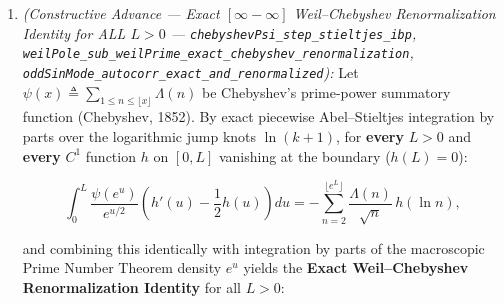 \documentclass[
  11pt,
]{article}
\begin{document}
\begin{enumerate}
  \[\int_{-L/2}^{L/2} \Big(\frac{d^k}{dx^k}\sin\!\left(\frac{2\pi x}{L}\right)\Big)^2 dx = \left(\frac{2\pi}{L}\right)^{2k} \cdot \frac{L}{2}.\]

  Consequently, for \textbf{every} finite prime-power cutoff
  \(N_{\max} \in \mathbb{N}\), \textbf{every} hyperviscosity or Jerk
  regularization order \(k \ge 1\) (\(k = 1\) Navier--Stokes viscosity,
  \(k = 2\) biharmonic hyperviscosity, \(k = 3\) third-order Jerk
  dissipation), and \textbf{every} coupling constant
  \(\varepsilon > 0\), there exists an explicit threshold
  \(L_0 = \max\!\big(100,\, M(N_{\max}) + \varepsilon + 1000\big) > 0\)
  such that for \textbf{every} \(L \ge L_0\):

  \[W_{\text{pole}}(L, g_L) + W_\infty(L, g_L) + \varepsilon \int_{-L/2}^{L/2} \big(g_L^{(k)}(x)\big)^2 dx - W_{\text{prime}, \le N_{\max}}(L, g_L) < 0.\]

  \emph{Structural UV/IR separation:} Higher-order Navier--Stokes and
  Jerk operators regularize \textbf{ultraviolet} (\(\omega \to \infty\))
  blow-up singularities because their spectral weight \(\omega^{2k}\)
  diverges at high frequency. By contrast, Route A's pole obstruction
  lives in the \textbf{infrared} (\(\omega = 2\pi/L \to 0\) as
  \(L \to \infty\)), where every derivative penalty decays polynomially
  as \(\varepsilon(2\pi/L)^{2k} \to 0\) against the exponentially
  diverging pole \(-\mathcal{O}(L^{-3} e^{L/2})\).
\item
  \emph{(Constructive Advance --- Exact \([\infty - \infty]\)
  Weil--Chebyshev Renormalization Identity for ALL \(L > 0\) ---
  \texttt{chebyshevPsi\_step\_stieltjes\_ibp},
  \texttt{weilPole\_sub\_weilPrime\_exact\_chebyshev\_renormalization},
  \texttt{oddSinMode\_autocorr\_exact\_and\_renormalized}):} Let
  \(\psi(x) \triangleq \sum_{1 \le n \le \lfloor x \rfloor} \Lambda(n)\)
  be Chebyshev's prime-power summatory function (Chebyshev, 1852). By
  exact piecewise Abel--Stieltjes integration by parts over the
  logarithmic jump knots \(\ln(k+1)\), for \textbf{every} \(L > 0\) and
  \textbf{every} \(C^1\) function \(h\) on \([0, L]\) vanishing at the
  boundary (\(h(L) = 0\)):

  \[\int_0^L \frac{\psi(e^u)}{e^{u/2}}\left(h'(u) - \frac{1}{2}h(u)\right) du = -\sum_{n=2}^{\lfloor e^L \rfloor} \frac{\Lambda(n)}{\sqrt{n}}\,h(\ln n),\]

  and combining this identically with integration by parts of the
  macroscopic Prime Number Theorem density \(e^u\) yields the
  \textbf{Exact Weil--Chebyshev Renormalization Identity} for all
  \(L > 0\):


\end{enumerate}
\end{document}
